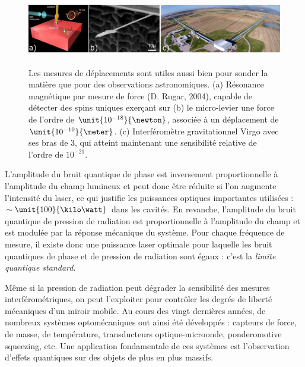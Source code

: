 \documentclass[12pt,a4paper]{article}
\begin{document}
\begin{figure}
\center
\includegraphics[height=90pt]{figures/displacement.png}
\caption{Les mesures de déplacements sont utiles aussi bien pour sonder la matière que pour des observations astronomiques.
(a) Résonance magnétique par mesure de force (D. Rugar, 2004), capable de détecter des spins uniques exerçant sur (b) le micro-levier une force de l'ordre de $\unit{10^{-18}}{\newton}$, associée à un déplacement de $\unit{10^{-10}}{\meter}$.
(c) Interféromètre gravitationnel Virgo avec ses bras de \unit{3}{\kilo\meter}, qui atteint maintenant une sensibilité relative de l'ordre de $10^{-21}$.}
\label{fig:displacement_measurement}
\end{figure}

L'amplitude du bruit quantique de phase est inversement proportionnelle à l'amplitude du champ lumineux et peut donc être réduite si l'on augmente l'intensité du laser, ce qui justifie les puissances optiques importantes utilisées : $\sim \unit{100}{\kilo\watt}$ dans les cavités.
En revanche, l'amplitude du bruit quantique de pression de radiation est proportionnelle à l'amplitude du champ et est modulée par la réponse mécanique du système.
Pour chaque fréquence de mesure, il existe donc une puissance laser optimale pour laquelle les bruit quantiques de phase et de pression de radiation sont égaux : c'est la \textit{limite quantique standard}.

Même si la pression de radiation peut dégrader la sensibilité des mesures interférométriques, on peut l'exploiter pour contrôler les degrés de liberté mécaniques d'un miroir mobile.
Au cours des vingt dernières années, de nombreux systèmes optomécaniques ont ainsi été développés : capteurs de force, de masse, de température, transducteurs optique-microonde, ponderomotive squeezing, etc.
Une application fondamentale de ces systèmes est l'observation d'effets quantiques sur des objets de plus en plus massifs.
\end{document}
